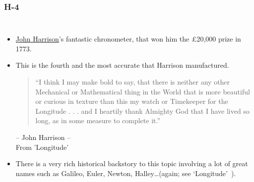 \begin{frame}
\frametitle{H-4}
\begin{columns}
\begin{itemize}
\item \href{http://en.wikipedia.org/wiki/John_Harrison}{John Harrison}'s fantastic chronometer, that won him the \pounds20,000 prize in 1773.
%
\item This is the fourth and the most accurate that Harrison manufactured.

{\small
\begin{flushleft}
\begin{quotation}
``I think I may make bold to say, that there is neither any other Mechanical or Mathematical thing in the World that is more beautiful or curious in texture than this my watch or Timekeeper for the Longitude . . . and I heartily thank Almighty God that I have lived so long, as in some measure to complete it.''
\end{quotation}			
\end{flushleft}
\begin{flushright}
-- John Harrison -- \\
From 'Longitude'~\cite{Sobel1995}
\end{flushright}	
}
%
\item There is a very rich historical backstory to this topic involving a lot of great names such as Galileo, Euler, Newton, Halley\ldots (again; see `Longitude'~\cite{Sobel1995}).
\end{itemize}
\end{columns}
\end{frame}


